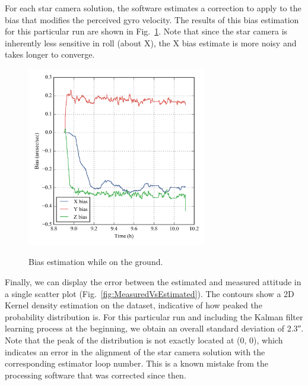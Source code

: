 For each star camera solution, the software estimates a correction to apply to the bias that modifies the perceived gyro velocity. The results of this bias estimation for this particular run are shown in Fig.~\ref{fig:BiasEstimate}. Note that since the star camera is inherently less sensitive in roll (about X), the X bias estimate is more noisy and takes longer to converge. 
\begin{figure}[!h]
\begin{center}
\includegraphics[width=0.7\textwidth]{Figures/bias_estimate.png}
\label{fig:BiasEstimate}
\caption[Bias estimation while on the ground]{Bias estimation while on the ground.}
\end{center}
\end{figure}

Finally, we can display the error between the estimated and measured attitude in a single scatter plot (Fig.~\ref{fig:MeasuredVsEstimated}). The contours show a 2D Kernel density estimation on the dataset, indicative of how peaked the probability distribution is. For this particular run and including the Kalman filter learning process at the beginning, we obtain an overall standard deviation of \ang{;;2.3}. Note that the peak of the distribution is not exactly located at (0, 0), which indicates an error in the alignment of the star camera solution with the corresponding estimator loop number. This is a known mistake from the processing software that was corrected since then.

